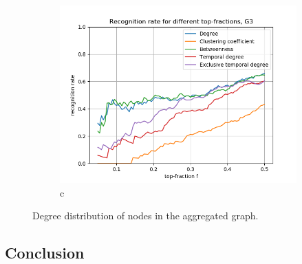 \documentclass[letterpaper]{article}
\begin{document}
\begin{figure}
\begin{subfigure}[b]{0.32\textwidth}
        \includegraphics[width=\textwidth]{img/rankG3.png}
        \caption{c}
	    \label{fig:degree_distribution_loglog}
    \end{subfigure}
    \caption{Degree distribution of nodes in the aggregated graph.}
    \label{fig:degree_distribution}
\end{figure}




\subsection*{Conclusion}
\todo{}



\end{document}
